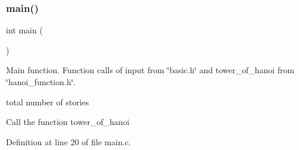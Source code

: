 \subsubsection{main()}
{\footnotesize\ttfamily int main (\begin{DoxyParamCaption}{ }\end{DoxyParamCaption})}



Main function. Function calls of input from \char`\"{}basic.\+h\char`\"{} and tower\+\_\+of\+\_\+hanoi from \char`\"{}hanoi\+\_\+function.\+h\char`\"{}. 

total number of stories

Call the function tower\+\_\+of\+\_\+hanoi 

Definition at line 20 of file main.\+c.

